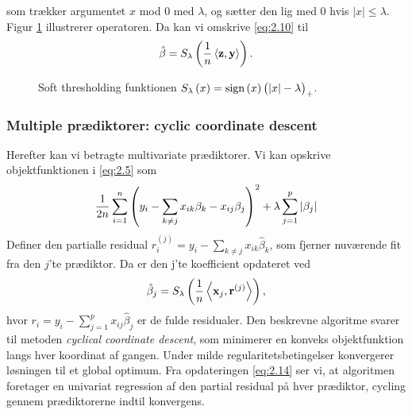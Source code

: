 som trækker argumentet $x$ mod 0 med $\lambda$, og sætter den lig med 0 hvis $\vert x \vert \leq \lambda$. 
Figur \ref{fig:soft_thresholding_fct} illustrerer operatoren.
Da kan vi omskrive \eqref{eq:2.10} til
\begin{align*}
\hat{\beta} = S_\lambda \del{\frac{1}{n} \left\langle \mathbf{z}, \mathbf{y} \right\rangle}.
\end{align*}
%
\begin{figure}[H]
\centering
\scalebox{0.8}{}
\caption[optional short text]{Soft thresholding funktionen $S_\lambda\del{x}=\text{sign}\del{x} \del{\vert x \vert - \lambda}_+$.} \label{fig:soft_thresholding_fct}
\end{figure}
%
\subsubsection{Multiple prædiktorer: cyclic coordinate descent}
Herefter kan vi betragte multivariate prædiktorer. 
Vi kan opskrive objektfunktionen i \eqref{eq:2.5} som
\begin{align*}
\frac{1}{2n} \sum_{i=1}^n \del{y_i - \sum_{k \neq j} x_{ik} \beta_k - x_{ij} \beta_j}^2 + \lambda \sum_{j = 1}^p \vert \beta_j \vert
\end{align*}
Definer den partialle residual $r_i^{(j)}=y_i - \sum_{k \neq j} x_{ik} \hat{\beta}_k$, som fjerner nuværende fit fra den $j$'te prædiktor.
Da er den j'te koefficient opdateret ved
\begin{align}
\hat{\beta}_j = S_\lambda \del{\frac{1}{n} \left\langle \mathbf{x}_j, \mathbf{r}^{(j)} \right\rangle}, \label{eq:2.14}
\end{align}
hvor \(r_i = y_i - \sum_{j = 1}^p x_{ij} \hat{\beta}_j \) er de fulde residualer.
Den beskrevne algoritme svarer til metoden \textit{cyclical coordinate descent}, som minimerer en konveks objektfunktion langs hver koordinat af gangen.
Under milde regularitetsbetingelser konvergerer løsningen til et global optimum.
Fra opdateringen \eqref{eq:2.14} ser vi, at algoritmen foretager en univariat regression af den partial residual på hver prædiktor, cycling gennem prædiktorerne indtil konvergens. \\

